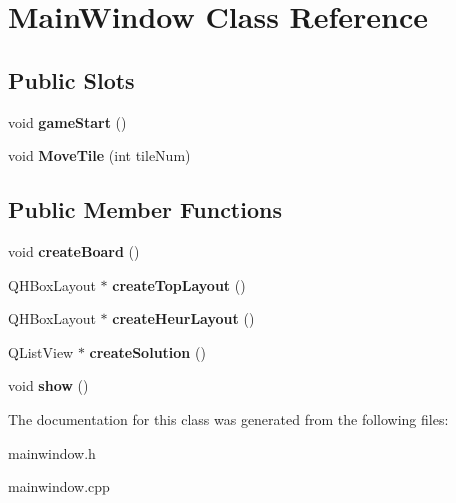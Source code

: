 \hypertarget{classMainWindow}{\section{\-Main\-Window \-Class \-Reference}
\label{classMainWindow}
}
\subsection*{\-Public \-Slots}
\begin{DoxyCompactItemize}
\item 
\hypertarget{classMainWindow_a02127f11adbe27c930b500fe442ad254}{void {\bfseries game\-Start} ()}\label{classMainWindow_a02127f11adbe27c930b500fe442ad254}

\item 
\hypertarget{classMainWindow_a2c753e1b4739a6ba23b9f4ab3c205c12}{void {\bfseries \-Move\-Tile} (int tile\-Num)}\label{classMainWindow_a2c753e1b4739a6ba23b9f4ab3c205c12}

\end{DoxyCompactItemize}
\subsection*{\-Public \-Member \-Functions}
\begin{DoxyCompactItemize}
\item 
\hypertarget{classMainWindow_ac4a19e31822e02d19b029d798a53a7fd}{void {\bfseries create\-Board} ()}\label{classMainWindow_ac4a19e31822e02d19b029d798a53a7fd}

\item 
\hypertarget{classMainWindow_aeea638e608801de4daa4616421d0b81f}{\-Q\-H\-Box\-Layout $\ast$ {\bfseries create\-Top\-Layout} ()}\label{classMainWindow_aeea638e608801de4daa4616421d0b81f}

\item 
\hypertarget{classMainWindow_a77f1f9b13a1b095055d347392e3a4502}{\-Q\-H\-Box\-Layout $\ast$ {\bfseries create\-Heur\-Layout} ()}\label{classMainWindow_a77f1f9b13a1b095055d347392e3a4502}

\item 
\hypertarget{classMainWindow_a52f60de77f51c940948d61d4569476e2}{\-Q\-List\-View $\ast$ {\bfseries create\-Solution} ()}\label{classMainWindow_a52f60de77f51c940948d61d4569476e2}

\item 
\hypertarget{classMainWindow_ae3d7a4598609a86e8bd317c0d85c4495}{void {\bfseries show} ()}\label{classMainWindow_ae3d7a4598609a86e8bd317c0d85c4495}

\end{DoxyCompactItemize}


\-The documentation for this class was generated from the following files\-:\begin{DoxyCompactItemize}
\item 
mainwindow.\-h\item 
mainwindow.\-cpp\end{DoxyCompactItemize}
